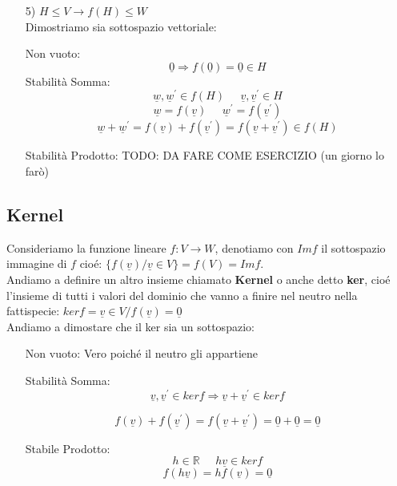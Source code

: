\begin{itemize}
\item[5)] $H \le V \rightarrow f(H) \le W$\\
Dimostriamo sia sottospazio vettoriale:

\subitem Non vuoto:
$$ \underline{0} \Rightarrow f(\underline{0})= \underline{0} \in H $$
\subitem Stabilità Somma:
$$ \underline{w},\underline{w}^{\prime} \in f(H) \;\;\;\;\; \underline{v},\underline{v}^{\prime} \in H $$
$$ \underline{w} = f(\underline{v}) \;\;\;\;\; \underline{w}^{\prime} = f(\underline{v}^{\prime}) $$
$$ \underline{w}+\underline{w}^{\prime} = f(\underline{v})+f(\underline{v}^{\prime})= f(\underline{v}+\underline{v}^{\prime}) \in f(H) $$

\subitem Stabilità Prodotto:
TODO: DA FARE COME ESERCIZIO (un giorno lo farò)

\end{itemize}

\subsection{Kernel}

Consideriamo la funzione lineare $f: V \rightarrow W$, denotiamo con $Im f$ il sottospazio immagine di $f$ cioé: $\{f(\underline{v})/\underline{v} \in V\}=f(V) = Im f$.\\

Andiamo a definire un altro insieme chiamato \textbf{Kernel} o anche detto \textbf{ker}, cioé l'insieme di tutti i valori del dominio che vanno a finire nel neutro nella fattispecie: $ ker f = {\underline{v} \in V / f(\underline{v}) = \underline{0}} $\\

Andiamo a dimostare che il ker sia un sottospazio:
\begin{itemize}
\item[Non vuoto:] Vero poiché il neutro gli appartiene

\item[Stabilità Somma:]
$$ \underline{v},\underline{v}^{\prime} \in ker f \Rightarrow \underline{v}+\underline{v}^{\prime} \in ker f $$

$$ f(\underline{v})+f(\underline{v}^{\prime}) = f(\underline{v}+ \underline{v}^{\prime}) = \underline{0}+\underline{0} = \underline{0} $$

\item[Stabile Prodotto:]
$$ h \in \mathbb{R} \;\;\;\;\; h\underline{v} \in ker f$$
$$ f(h\underline{v}) = hf(\underline{v}) = \underline{0} $$

\end{itemize}

